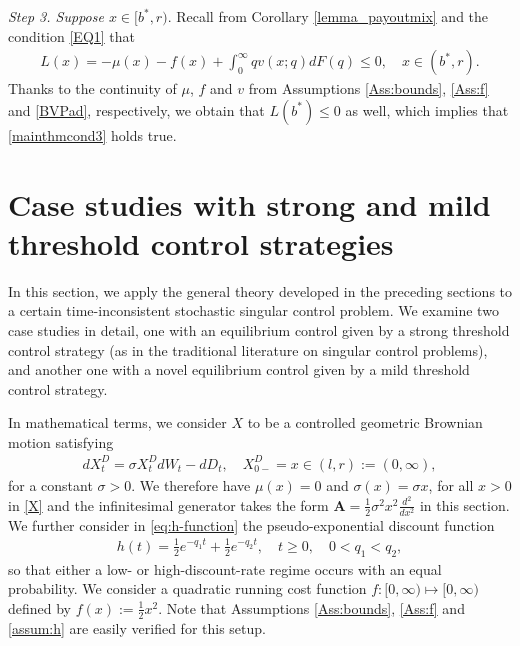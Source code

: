 \documentclass[11pt]{article} %
\numberwithin{komcounter}{section}
\begin{document}
\vspace{1mm}
{\it Step 3. Suppose $x \in [b^*,r)$}. 
Recall from Corollary \ref{lemma_payoutmix} and the condition \eqref{EQ1} that 
\begin{align*}
L(x) 
= - \mu(x) - f(x) + \int_0^\infty q v(x;q) dF(q) \leq 0, \quad x \in (b^*,r).
\end{align*}
Thanks to the continuity of $\mu$, $f$ and $v$ from Assumptions \ref{Ass:bounds}, \ref{Ass:f} and \eqref{BVPad}, respectively, we obtain that $L(b^*) \leq 0$ as well, which implies that \eqref{mainthmcond3} holds true. 
\hfill \qedsymbol{}

 


\section{Case studies with strong and mild threshold control strategies}
\label{sec:mixopt}

In this section, we apply the general theory developed in the preceding sections to a certain time-inconsistent stochastic singular control problem. We examine two case studies in detail, one 
with an equilibrium control given by a strong threshold control strategy (as in the traditional literature on singular control problems), and another one with a novel equilibrium control given by a mild threshold control strategy. 

In mathematical terms, we consider $X$ to be a controlled geometric Brownian motion satisfying  
\begin{align}\label{example_GBM}
dX^D_t=\sigma X^D_tdW_t-dD_t, \quad X^D_{0-}= x \in (l,r) := (0,\infty),
\end{align}
for a constant $\sigma>0$.
We therefore have $\mu(x)=0$ and $\sigma(x)=\sigma x$, for all $x>0$ in \eqref{X} and the infinitesimal generator takes the form $\textbf{A} = \frac{1}{2}\sigma^2 x^2 \frac{d^2}{d x^2}$ in this section. 
We further consider in \eqref{eq:h-function} the pseudo-exponential discount function 
\begin{align*}
h(t) = \tfrac12 e^{-q_1 t} + \tfrac12 e^{-q_2 t}, \quad t \geq 0, \quad 0<q_1<q_2, 
\end{align*} 
so that either a low- or high-discount-rate regime occurs with an equal probability.
We consider a quadratic running cost function $f:[0,\infty) \mapsto [0,\infty)$ defined by $f(x):=\frac12 x^2$.  Note that Assumptions \ref{Ass:bounds}, \ref{Ass:f} and \ref{assum:h} are easily verified for this setup. 
\end{document}

